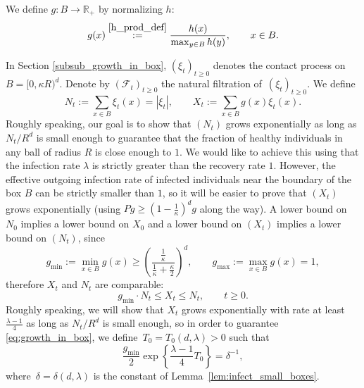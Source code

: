 \documentclass[a4paper,12pt]{article}
\begin{document}
We define $g: B \to \mathbb{R}_+$ by normalizing $h$:
\begin{equation}\label{g_def_eq_from_h}
 g(x) \stackrel{ \eqref{h_prod_def} }{:=} \frac{h(x)}{\max_{y \in B} h(y)},\qquad x \in B.
 \end{equation}



In Section \ref{subsub_growth_in_box}, $(\xi_t)_{t \geq 0}$ denotes the contact process on~$B=[0,\kappa R)^d$.
Denote by $(\mathscr{F}_t)_{t \geq 0}$  the natural filtration of~$(\xi_t)_{t \geq 0}$.
We define
\begin{equation}\label{N_X_def}
 N_t := \sum_{x\in B} \xi_t(x)= |\xi_t|  ,\qquad X_t := \sum_{x \in B} g(x) \xi_t(x).
 \end{equation}
 Roughly speaking, our goal is to show that $(N_t)$ grows exponentially as long as $N_t/R^d$ is small enough to guarantee that the fraction of  healthy individuals  in any ball of radius $R$ is close enough to $1$.
 We would like to achieve this using that the infection rate $\lambda$ is strictly greater than the recovery rate $1$.
 However, the effective outgoing infection rate of infected individuals near the boundary of the box $B$ can be strictly smaller than $1$, so
   it will be easier to prove that $(X_t)$ grows exponentially (using $P g \geq (1-\frac{1}{\kappa})^d g$ along the way).
     A lower bound on $N_0$ implies a lower bound on $X_0$ and a lower bound on $(X_t)$ implies a lower bound on $(N_t)$, since
\begin{equation} \label{eq:bounds_on_g}
g_{\min} :=  \min_{x \in B} g(x) \ge \left(\frac{\tfrac{1}{\kappa}}{\tfrac{1}{\kappa} + \tfrac{\kappa}{2}}\right)^d,\qquad
g_{\max} := \max_{x \in B} g(x) = 1,
\end{equation}
therefore $X_t$ and $N_t$ are comparable:
\begin{equation}\label{N_t_X_t_comparable}
g_{\min} \cdot  N_t \leq  X_t \leq N_t, \qquad t \geq 0.
\end{equation}
Roughly speaking, we will show that $X_t$ grows exponentially with rate at least $\frac{\lambda-1}{4}$ as long as $N_t/R^d$ is small enough, so in order to guarantee
 \eqref{eq:growth_in_box}, we define~$T_0=T_0(d,\lambda) > 0$ such  that
\begin{equation}\label{choose_T_0}
\frac{g_{\min} }{2} \exp\left\{ \frac{\lambda - 1}{4} {T_0}\right\} = \delta^{-1},
\end{equation}
where~$\delta=\delta(d,\lambda)$ is the constant of Lemma~\ref{lem:infect_small_boxes}.
\end{document}
